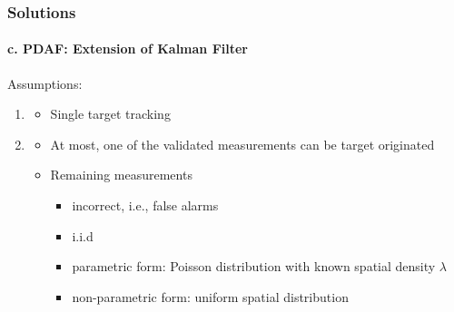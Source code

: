 \documentclass{beamer}
\begin{document}
\begin{frame}
\frametitle{Solutions}
\framesubtitle{c. PDAF: Extension of Kalman Filter}
\mypagenum
Assumptions:
\begin{enumerate}
\item  {\color{red}{Number of targets}}
\begin{itemize}
\item Single target tracking
\end{itemize}
\item {\color{red}{False alarms}}
\begin{itemize} 
\item At most, one of the validated measurements can be target originated	
\item Remaining measurements
\begin{itemize}
\item incorrect, i.e., false alarms
\item i.i.d
\item parametric form: Poisson distribution with known spatial density $\lambda$
\item non-parametric form: uniform spatial distribution
\end{itemize}
\end{itemize}
\end{enumerate}
\end{frame}




\end{document}
